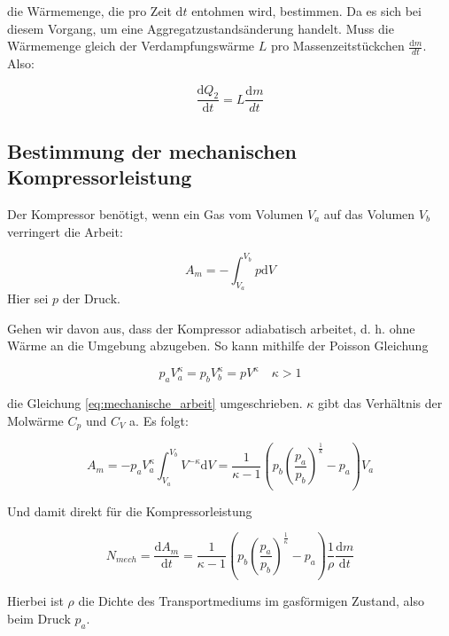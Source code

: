die Wärmemenge, die pro Zeit $\mathup{d}t$ entohmen wird, bestimmen.
Da es sich bei diesem Vorgang, um eine Aggregatzustandsänderung handelt.
Muss die Wärmemenge gleich der Verdampfungswärme $L$ pro Massenzeitstückchen $\frac{\mathup{d}m}{dt}$.
Also:

\begin{equation*}
\frac{\mathup{d} Q_2}{\mathup{d} t}=L\frac{\mathup{d}m}{dt}
\end{equation*}

\subsection{Bestimmung der mechanischen Kompressorleistung}

Der Kompressor benötigt, wenn ein Gas vom Volumen $V_a$ auf das Volumen $V_b$ verringert
die Arbeit:

\begin{equation}
\label{eq:mechanische_arbeit}
A_m=-\int_{V_a}^{V_b}p\mathup{d}V
\end{equation}
Hier sei $p$ der Druck.

Gehen wir davon aus, dass der Kompressor adiabatisch arbeitet,
d. h. ohne Wärme an die Umgebung abzugeben. 
So kann mithilfe der Poisson Gleichung

\begin{equation*}
p_aV^{\kappa}_a=p_bV^{\kappa}_b=pV^{\kappa} \quad \kappa>1
\end{equation*}

die Gleichung \eqref{eq:mechanische_arbeit} umgeschrieben.
$\kappa$ gibt das Verhältnis der Molwärme $C_p$ und $C_V$ a.
Es folgt:

\begin{equation*}
A_m=-p_aV_a^{\kappa}\int_{V_a}^{V_b}V^{-\kappa}\mathup{d}V=\frac{1}{\kappa-1}\left(p_b\left(\frac{p_a}{p_b}\right)^{\frac{1}{k}}-p_a\right)V_a
\end{equation*}

Und damit direkt für die Kompressorleistung

\begin{equation*}
N_{mech}=\frac{\mathup{d}A_m}{\mathup{d}t}=\frac{1}{\kappa-1}\left(p_b\left(\frac{p_a}{p_b}\right)^{\frac{1}{\kappa}}-p_a\right)\frac{1}{\rho}\frac{\mathup{d}m}{\mathup{d}t}
\end{equation*}

Hierbei ist $\rho$ die Dichte des Transportmediums im gasförmigen Zustand, also beim Druck $p_a$.



